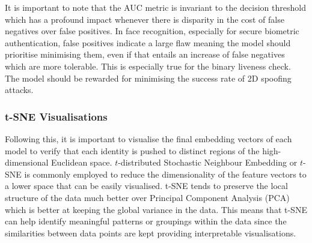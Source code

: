 \documentclass{mpaper}
\begin{document}
It is important to note that the AUC metric is invariant to the decision threshold which has a profound impact whenever there is disparity in the cost of false negatives over false positives. In face recognition, especially for secure biometric authentication, false positives indicate a large flaw meaning the model should prioritise minimising them, even if that entails an increase of false negatives which are more tolerable. This is especially true for the binary liveness check. The model should be rewarded for minimising the success rate of 2D spoofing attacks.

\begin{table}[htbp]
    \centering
    \vspace{0.1cm}
    \caption{Table listing the macro-averaged AUC metrics for all fusion methods as well as the individual modalities.}
    \label{tab:macro_auc}
\end{table}


\subsubsection{t-SNE Visualisations}
Following this, it is important to visualise the final embedding vectors of each model to verify that each identity is pushed to distinct regions of the high-dimensional Euclidean space. $t$-distributed Stochastic Neighbour Embedding or $t$-SNE \cite{van2008visualizing} is commonly employed to reduce the dimensionality of the feature vectors to a lower space that can be easily visualised. t-SNE tends to preserve the local structure of the data much better over Principal Component Analysis (PCA) which is better at keeping the global variance in the data. This means that t-SNE can help identify meaningful patterns or groupings within the data since the similarities between data points are kept providing interpretable visualisations.
\end{document}
